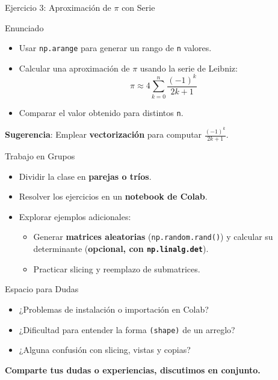 \documentclass[10pt]{beamer}
\begin{document}
\begin{frame}{Ejercicio 3: Aproximación de \(\pi\) con Serie}
  \begin{block}{Enunciado}
    \begin{itemize}
      \item Usar \texttt{np.arange} para generar un rango de \texttt{n} valores.
      \item Calcular una aproximación de \(\pi\) usando la serie de Leibniz:
      \[
        \pi \approx 4 \sum_{k=0}^{n} \frac{(-1)^k}{2k+1}
      \]
      \item Comparar el valor obtenido para distintos \texttt{n}.
    \end{itemize}
  \end{block}
  \textbf{Sugerencia}: Emplear \textbf{vectorización} para computar \(\frac{(-1)^k}{2k+1}\).
\end{frame}

\begin{frame}{Trabajo en Grupos}
  \begin{itemize}
    \item Dividir la clase en \textbf{parejas o tríos}.
    \item Resolver los ejercicios en un \textbf{notebook de Colab}.
    \item Explorar ejemplos adicionales: 
      \begin{itemize}
        \item Generar \textbf{matrices aleatorias} (\texttt{np.random.rand()}) y calcular su determinante (\textbf{opcional, con \texttt{np.linalg.det}}).
        \item Practicar slicing y reemplazo de submatrices.
      \end{itemize}
  \end{itemize}
\end{frame}

\begin{frame}{Espacio para Dudas}
  \begin{itemize}
    \item ¿Problemas de instalación o importación en Colab?
    \item ¿Dificultad para entender la forma \texttt{(shape)} de un arreglo?
    \item ¿Alguna confusión con slicing, vistas y copias?
  \end{itemize}
  \vspace{0.3cm}
  \textbf{Comparte tus dudas o experiencias, discutimos en conjunto.}
\end{frame}
\end{document}

